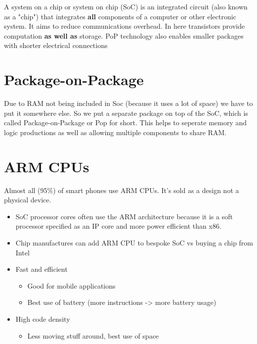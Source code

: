 \documentclass{article}
\begin{document}
\begin{flushleft}
A system on a chip or system on chip (SoC) is an integrated circuit (also known as a "chip") that integrates \textbf{all} components of a computer or other electronic system. It aims to reduce communications overhead. In here transistors provide computation \textbf{as well as} storage. PoP technology also enables smaller packages with shorter electrical connections
\end{flushleft}

\section{Package-on-Package}

\begin{flushleft}
Due to RAM not being included in Soc (because it uses a lot of space) we have to put it somewhere else. So we put a separate package on top of the SoC, which is called Package-on-Package or Pop for short. This helps to seperate memory and logic productions as well as allowing multiple components to share RAM.
\end{flushleft}

\section{ARM CPUs}

Almost all (95\%) of smart phones use ARM CPUs. It's sold as a design not a physical device.
\begin{itemize}
  \item SoC processor cores often use the ARM architecture because it is a soft processor specified as an IP core and more power efficient than x86.
  \item Chip manufactures can add ARM CPU to bespoke SoC vs
buying a chip from Intel
  \item Fast and efficient
  \begin{itemize}
    \item Good for mobile applications
    \item Best use of battery (more instructions -> more battery usage)
  \end{itemize}
  \item High code density
  \begin{itemize}
    \item Less moving stuff around, best use of space
  \end{itemize}
\end{itemize}
\end{document}
